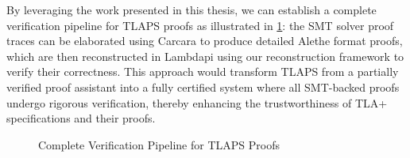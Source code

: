 By leveraging the work presented in this thesis, we can establish a complete verification pipeline for TLAPS proofs as illustrated in \cref{"Complete Verification Pipeline for TLAPS Proofs"
}: the SMT solver proof traces can be elaborated using Carcara to produce detailed Alethe format proofs, which are then reconstructed in Lambdapi using our reconstruction framework to verify their correctness.
This approach would transform TLAPS from a partially verified proof assistant into a fully certified system where all SMT-backed proofs undergo rigorous verification, thereby enhancing the trustworthiness of TLA+ specifications and their proofs.

\begin{figure}

\caption[TLAPS verification pipeline]{Complete Verification Pipeline for TLAPS Proofs}
\label{"Complete Verification Pipeline for TLAPS Proofs"
}
\end{figure}